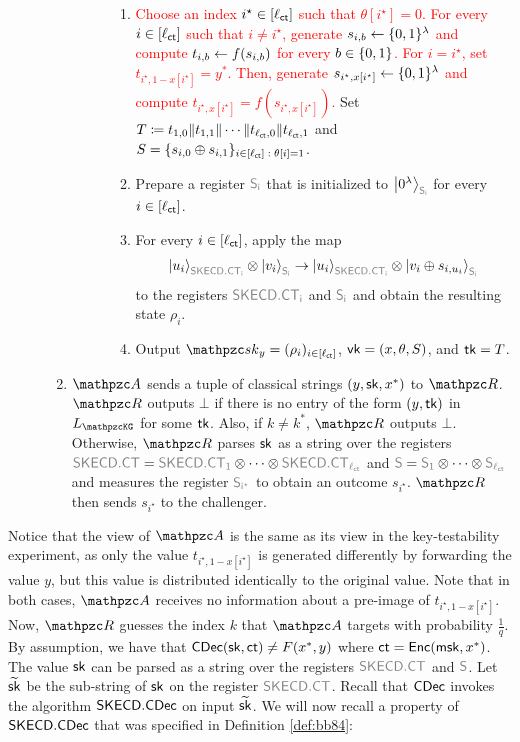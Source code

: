 \begin{description}
\begin{enumerate}
\begin{description}
\begin{enumerate}
\item \textcolor{red}{Choose an index $i^\star \in [\ell_{\mathsf{ct}}]$ such
that $\theta[i^\star] = 0$. For every $i \in [\ell_{\mathsf{ct}}]$ such
that $i \neq i^\star$, generate $s_{i,b}\leftarrow\{0,1\}^\lambda$ and compute
$t_{i,b}\leftarrow f(s_{i,b})$ for every $b\in\{0,1\}$. For $i = i^\star$,
set $t_{i^\star, 1 - x[i^\star]} = y^*$. Then, generate $s_{i^\star,
x[i^\star]} \leftarrow \{0,1\}^\lambda$ and compute $t_{i^\star,
x[i^\star]} = f(s_{i^\star, x[i^\star]})$.}
   Set $T\coloneqq
    t_{1,0}\|t_{1,1}\|\cdots\|t_{\ell_{\mathsf{ct}},0}\|t_{\ell_{\mathsf{ct}},1}$ and $S =
    \{s_{i,0} \oplus s_{i, 1}\}_{i \in [\ell_{\mathsf{ct}}] \; : \;\theta[i] =
    1}$.
    \item Prepare a register $\qreg{S_i}$ that is initialized to
    $\ket{0^\secp}_{\qreg{S_i}}$ for every $i\in[\ell_{\mathsf{ct}}]$. 
    \item For every $i\in[\ell_{\mathsf{ct}}]$, apply the map
    \begin{align}
    \ket{u_i}_{\qreg{SKECD.CT_i}}\tensor\ket{v_i}_{\qreg{S_i}}
    \ra
    \ket{u_i}_{\qreg{SKECD.CT_i}}\tensor\ket{v_i\oplus s_{i,u_i}}_{\qreg{S_i}}
    \end{align}
    to the registers $\qreg{SKECD.CT_i}$ and $\qreg{S_i}$ and obtain the resulting state $\rho_i$.
    \item Output $\qsk_y = (\rho_i)_{i\in{[\ctlen]}}$,
    $\mathsf{vk}=(x,\theta,S)$, and $\mathsf{tk}=T$.
\end{enumerate}
\end{description}

\item $\qA$ sends a tuple of classical strings $(y, \mathsf{sk}, x^*)$ to $\qR$.
$\qR$ outputs $\bot$ if there is no entry of the form $(y,\mathsf{tk})$ in
$\List{\qKG}$ for some $\mathsf{tk}$. Also, if $k \neq k^*$, $\qR$ outputs $\bot$.
Otherwise, $\qR$ parses $\mathsf{sk}$ 
as a string over the registers $\qreg{SKECD.CT} = \qreg{SKECD.CT_1}
\otimes \cdots \otimes
\qreg{SKECD.CT_{\ctlen}}$ and $\qreg{S} = \qreg{S_1} \otimes
\cdots \otimes \qreg{S_{\ctlen}}$ and measures the register
$\qreg{S_{i^\star}}$ to obtain an outcome $s_{i^\star}$. $\qR$
then sends $s_{i^\star}$ to the challenger.
\end{enumerate}
\end{description}

Notice that the view of $\qA$ is the same as its view in the
key-testability experiment, as only the value $t_{i^\star,
1-x[i^\star]}$ is generated differently by forwarding the value $y$,
but this value is distributed identically to the original value.
Note that in both cases, $\qA$ receives no information about a
pre-image of $t_{i^\star, 1-x[i^\star]}$.
Now, $\qR$ guesses the index $k$ that $\qA$ targets with probability
$\frac1q$. By assumption, we have that $\mathsf{CDec}(\mathsf{sk}, \mathsf{ct})
\neq F(x^*, y)$ where $\mathsf{ct} = \mathsf{Enc}(\mathsf{msk}, x^*)$. The value $\mathsf{sk}$ can be
parsed as a string over the registers $\qreg{SKECD.CT}$ and
$\qreg{S}$. Let $\widetilde{\mathsf{sk}}$ be the sub-string of $\mathsf{sk}$ on the
register $\qreg{SKECD.CT}$. Recall that $\mathsf{CDec}$ invokes the
algorithm $\mathsf{SKECD}.\mathsf{CDec}$ on input $\widetilde{\mathsf{sk}}$. We will
now recall a property of $\mathsf{SKECD}.\mathsf{CDec}$ that was specified in
Definition \ref{def:bb84}:

